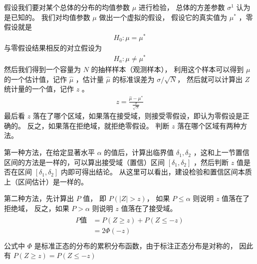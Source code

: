 \documentclass[letterpaper,10pt,english]{sphinxmanual}
\begin{document}
假设我们要对某个总体的分布的均值参数 \(\mu\) 进行检验，
总体的方差参数 \(\sigma^1\) 认为是已知的。
我们对均值参数 \(\mu\) 做出一个虚拟的假设，
假设它的真实值为 \(\mu^*\)
，零假设就是
\begin{equation}\label{equation:推断与检验/content:推断与检验/content:89}
\begin{split}H_0 : \mu = \mu^*\end{split}
\end{equation}
与零假设结果相反的对立假设为
\begin{equation}\label{equation:推断与检验/content:推断与检验/content:90}
\begin{split}H_a: \mu \neq \mu^*\end{split}
\end{equation}
然后我们得到一个容量为 \(N\) 的抽样样本（观测样本），
利用这个样本可以得到 \(\mu\) 的一个估计值，记作 \(\hat{\mu}\)
，估计量 \(\hat{\mu}\) 的标准误差为
\(\sigma/\sqrt{N}\)，
然后就可以计算出 \(Z\) 统计量的一个值，记作 \(z\)
。
\begin{equation}\label{equation:推断与检验/content:推断与检验/content:91}
\begin{split}z = \frac{\hat{\mu} - \mu^* }{\frac{\sigma}{\sqrt{N}}}\end{split}
\end{equation}
最后看 \(z\) 落在了哪个区域，如果落在接受域，则接受零假设，即认为零假设是正确的。
反之，如果落在拒绝域，就拒绝零假设。
判断 \(z\) 落在哪个区域有两种方法。

第一种方法，在给定显著水平 \(\alpha\) 的值后，计算出临界值 \(\delta_1,\delta_2\)
，这和上一节置信区间的方法是一样的，可以算出接受域（置信）区间 \([\delta_1,\delta_2]\)
，然后判断 \(z\) 值是否在区间 \([\delta_1,\delta_2]\) 内即可得出结论。
从这里可以看出，建设检验和置信区间本质上（区间估计）是一样的。

第二种方法，先计算出 \(P\) 值，
即 \(P(|Z|>z)\)，
如果 \(P \leq \alpha\) 则说明 \(z\) 值落在了拒绝域，
反之，如果 \(P>\alpha\) 则说明 \(z\) 值落在了接受域。
\begin{align}\label{equation:推断与检验/content:推断与检验/content:92}\!\begin{aligned}
P\text{值} &= P(Z \geq z) + P(Z \leq -z)\\
&= 2 \Phi(-z)\\
\end{aligned}\end{align}
公式中 \(\Phi\) 是标准正态的分布的累积分布函数，由于标注正态分布是对称的，
因此有 \(P(Z \geq z)=P(Z \leq -z)\)
\end{document}
